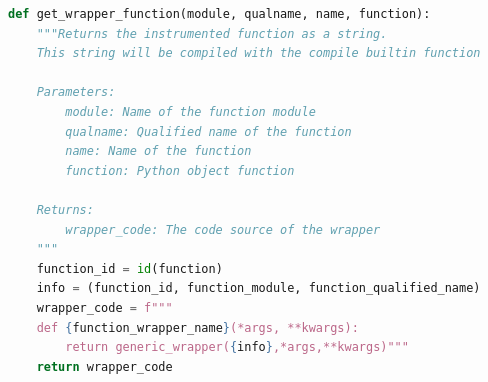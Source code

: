 \documentclass[11pt]{article}
\newcommand{\tristan}[1]{\color{orange}\textbf{From Tristan:} #1\color{black}\xspace}
\newcommand{\pytracer}[0]{PyTracer\xspace}
\begin{document}
%




\begin{listing}
    \centering
\begin{lstlisting}[language=Python,style=customPython]
def get_wrapper_function(module, qualname, name, function):
    """Returns the instrumented function as a string.
    This string will be compiled with the compile builtin function
    
    Parameters:
        module: Name of the function module
        qualname: Qualified name of the function
        name: Name of the function
        function: Python object function
        
    Returns:
        wrapper_code: The code source of the wrapper
    """
    function_id = id(function)
    info = (function_id, function_module, function_qualified_name)
    wrapper_code = f"""
    def {function_wrapper_name}(*args, **kwargs):
        return generic_wrapper({info},*args,**kwargs)"""
    return wrapper_code
\end{lstlisting}
    \caption{Function to create the instrumented version of a function.
    \pytracer uses the identifier of the function instead of the 
    actual function to handle aliases and avoid duplicate instrumentation.}
    \label{fig:wrapper_creation}
\end{listing}
\end{document}
